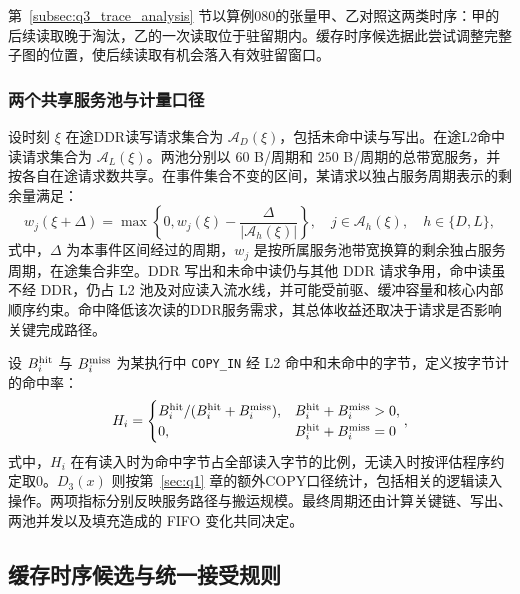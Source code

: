 第~\ref{subsec:q3_trace_analysis} 节以算例080的张量甲、乙对照这两类时序：甲的后续读取晚于淘汰，乙的一次读取位于驻留期内。缓存时序候选据此尝试调整完整子图的位置，使后续读取有机会落入有效驻留窗口。

\subsubsection{两个共享服务池与计量口径}
设时刻 $\xi$ 在途DDR读写请求集合为 $\mathcal A_D(\xi)$，包括未命中读与写出。在途L2命中读请求集合为 $\mathcal A_L(\xi)$。两池分别以 $60$ B/周期和 $250$ B/周期的总带宽服务，并按各自在途请求数共享。在事件集合不变的区间，某请求以独占服务周期表示的剩余量满足：
\begin{equation}
 w_j(\xi+\Delta)=
 \max\!\left\{0,w_j(\xi)-\frac{\Delta}{|\mathcal A_h(\xi)|}\right\},
 \quad j\in\mathcal A_h(\xi),\quad h\in\{D,L\},
 \label{eq:q3_two_pools}
\end{equation}
\noindent 式中，$\Delta$ 为本事件区间经过的周期，$w_j$ 是按所属服务池带宽换算的剩余独占服务周期，在途集合非空。DDR 写出和未命中读仍与其他 DDR 请求争用，命中读虽不经 DDR，仍占 L2 池及对应读入流水线，并可能受前驱、缓冲容量和核心内部顺序约束。命中降低该次读的DDR服务需求，其总体收益还取决于请求是否影响关键完成路径。

设 $B_i^{\rm hit}$ 与 $B_i^{\rm miss}$ 为某执行中 \texttt{COPY\_IN} 经 L2 命中和未命中的字节，定义按字节计的命中率：
\begin{equation}
 H_i=\begin{cases}B_i^{\rm hit}/(B_i^{\rm hit}+B_i^{\rm miss}),&B_i^{\rm hit}+B_i^{\rm miss}>0,\\0,&B_i^{\rm hit}+B_i^{\rm miss}=0\end{cases},
 \label{eq:q3_hit}
\end{equation}
\noindent 式中，$H_i$ 在有读入时为命中字节占全部读入字节的比例，无读入时按评估程序约定取0。$D_3(x)$ 则按第~\ref{sec:q1} 章的额外COPY口径统计，包括相关的逻辑读入操作。两项指标分别反映服务路径与搬运规模。最终周期还由计算关键链、写出、两池并发以及填充造成的 FIFO 变化共同决定。

\subsection{缓存时序候选与统一接受规则}
